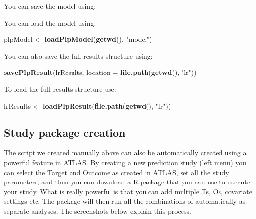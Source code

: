 \documentclass[]{article}
\newenvironment{Shaded}{\begin{snugshade}}{\end{snugshade}}
\newcommand{\KeywordTok}[1]{\textcolor[rgb]{0.13,0.29,0.53}{\textbf{#1}}}
\newcommand{\DataTypeTok}[1]{\textcolor[rgb]{0.13,0.29,0.53}{#1}}
\newcommand{\StringTok}[1]{\textcolor[rgb]{0.31,0.60,0.02}{#1}}
\newcommand{\OperatorTok}[1]{\textcolor[rgb]{0.81,0.36,0.00}{\textbf{#1}}}
\newcommand{\NormalTok}[1]{#1}
\begin{document}
You can save the model using:

\begin{Shaded}
\end{Shaded}

You can load the model using:

\begin{Shaded}
\begin{Highlighting}[]
\NormalTok{plpModel <-}\StringTok{ }\KeywordTok{loadPlpModel}\NormalTok{(}\KeywordTok{getwd}\NormalTok{(), }\StringTok{"model"}\NormalTok{)}
\end{Highlighting}
\end{Shaded}

You can also save the full results structure using:

\begin{Shaded}
\begin{Highlighting}[]
\KeywordTok{savePlpResult}\NormalTok{(lrResults, }\DataTypeTok{location =} \KeywordTok{file.path}\NormalTok{(}\KeywordTok{getwd}\NormalTok{(), }\StringTok{"lr"}\NormalTok{))}
\end{Highlighting}
\end{Shaded}

To load the full results structure use:

\begin{Shaded}
\begin{Highlighting}[]
\NormalTok{lrResults <-}\StringTok{ }\KeywordTok{loadPlpResult}\NormalTok{(}\KeywordTok{file.path}\NormalTok{(}\KeywordTok{getwd}\NormalTok{(), }\StringTok{"lr"}\NormalTok{))}
\end{Highlighting}
\end{Shaded}

\newpage

\subsection{Study package creation}\label{study-package-creation}

The script we created manually above can also be automatically created
using a powerful feature in ATLAS. By creating a new prediction study
(left menu) you can select the Target and Outcome as created in ATLAS,
set all the study parameters, and then you can download a R package that
you can use to execute your study. What is really powerful is that you
can add multiple Ts, Os, covariate settings etc. The package will then
run all the combinations of automatically as separate analyses. The
screenshots below explain this process.
\end{document}
